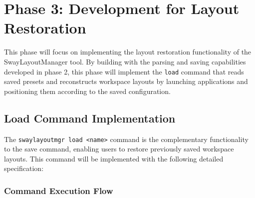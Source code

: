 \newpage

\section{Phase 3: Development for Layout Restoration}

This phase will focus on implementing the layout restoration functionality of the SwayLayoutManager tool. By building with the parsing and saving capabilities developed in phase 2, this phase will implement the \texttt{load} command that reads saved presets and reconstructs workspace layouts by launching applications and positioning them according to the saved configuration.

\subsection{Load Command Implementation}

The \texttt{swaylayoutmgr load <name>} command is the complementary functionality to the save command, enabling users to restore previously saved workspace layouts. This command will be implemented with the following detailed specification:

\subsubsection{Command Execution Flow}

